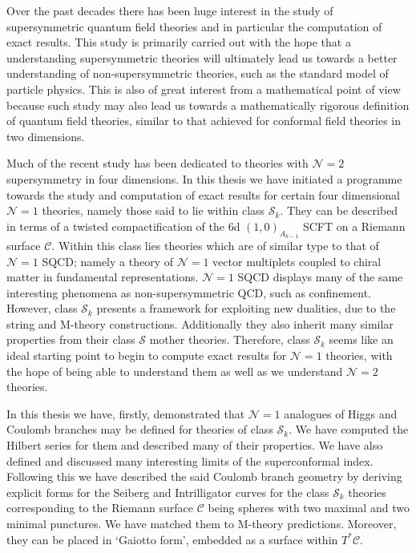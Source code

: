 \documentclass[main.tex]{subfiles}
\begin{document}
Over the past decades there has been huge interest in the study of supersymmetric quantum field theories and in particular the computation of exact results. This study is primarily carried out with the hope that a understanding supersymmetric theories will ultimately lead us towards a better understanding of non-supersymmetric theories, such as the standard model of particle physics. This is also of great interest from a mathematical point of view because such study may also lead us towards a mathematically rigorous definition of quantum field theories, similar to that achieved for conformal field theories in two dimensions.

Much of the recent study has been dedicated to theories with $\mathcal{N}=2$ supersymmetry in four dimensions. In this thesis we have initiated a programme towards the study and computation of exact results for certain four dimensional $\mathcal{N}=1$ theories, namely those said to lie within class $\mathcal{S}_k$. They can be described in terms of a twisted compactification of the 6d $(1,0)_{A_{k-1}}$ SCFT on a Riemann surface $\mathcal{C}$. Within this class lies theories which are of similar type to that of $\mathcal{N}=1$ SQCD; namely a theory of $\mathcal{N}=1$ vector multiplets coupled to chiral matter in fundamental representations. $\mathcal{N}=1$ SQCD displays many of the same interesting phenomena as non-supersymmetric QCD, such as confinement. However, class $\mathcal{S}_k$ presents a framework for exploiting new dualities, due to the string and M-theory constructions. Additionally they also inherit many similar properties from their class $\mathcal{S}$ mother theories. Therefore, class $\mathcal{S}_k$ seems like an ideal starting point to begin to compute exact results for $\mathcal{N}=1$ theories, with the hope of being able to understand them as well as we understand $\mathcal{N}=2$ theories.

In this thesis we have, firstly, demonstrated that $\mathcal{N}=1$ analogues of Higgs and Coulomb branches may be defined for theories of class $\mathcal{S}_k$. We have computed the Hilbert series for them and described many of their properties. We have also defined and discussed many interesting limits of the superconformal index. Following this we have described the said Coulomb branch geometry by deriving explicit forms for the Seiberg and Intrilligator curves for the class $\mathcal{S}_k$ theories corresponding to the Riemann surface $\mathcal{C}$ being spheres with two maximal and two minimal punctures. We have matched them to M-theory predictions. Moreover, they can be placed in `Gaiotto form', embedded as a surface within $T^*\mathcal{C}$.
\end{document}
